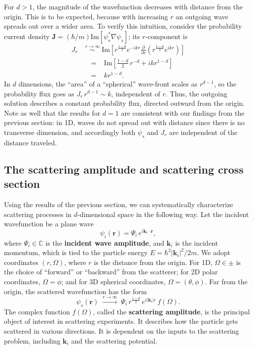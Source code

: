 \documentclass[pra,11pt]{revtex4}
\begin{document}
For $d > 1$, the magnitude of the wavefunction decreases with distance
from the origin.  This is to be expected, because with increasing $r$
an outgoing wave spreads out over a wider area.  To verify this
intuition, consider the probability current density
$\mathbf{J} = (\hbar/m) \mathrm{Im}\left[\psi_s^*\nabla\psi_s\right]$;
its $r$-component is
$$\begin{aligned}J_r \; &\overset{r\rightarrow\infty}{\sim} \; \mathrm{Im}\left[r^{\frac{1-d}{2}} e^{-ikr} \frac{\partial}{\partial r}\left(r^{\frac{1-d}{2}} e^{ikr}\right)\right] \\ &\;\;=\;\;\;\mathrm{Im}\left[\frac{1-d}{2}\, r^{-d} + ik r^{1-d}\right]\\ &\;\;=\;\;\; kr^{1-d}.\end{aligned}$$
In $d$ dimensions, the ``area'' of a ``spherical'' wave-front scales
as $r^{d-1}$, so the probability flux goes as $J_r \,r^{d-1} \sim k$,
independent of $r$.  Thus, the outgoing solution describes a constant
probability flux, directed outward from the origin.  Note as well that
the results for $d=1$ are consistent with our findings from the
previous section: in 1D, waves do not spread out with distance since
there is no transverse dimension, and accordingly both $\psi_s$ and
$J_r$ are independent of the distance traveled.

\subsection{The scattering amplitude and scattering cross section}

Using the results of the previous section, we can systematically
characterize scattering processes in $d$-dimensional space in the
following way.  Let the incident wavefunction be a plane wave
$$\psi_i(\mathbf{r}) = \Psi_i \, e^{i\mathbf{k}_i\cdot\mathbf{r}},$$
where $\Psi_i \in \mathbb{C}$ is the \textbf{incident wave amplitude},
and $\mathbf{k}_i$ is the incident momentum, which is tied to the
particle energy $E = \hbar^2|\mathbf{k}_i|^2/2m$.  We adopt
coordinates $(r,\Omega)$, where $r$ is the distance from the origin.
For 1D, $\Omega \in \pm$ is the choice of ``forward'' or ``backward''
from the scatterer; for 2D polar coordinates, $\Omega = \phi$; and for
3D spherical coordinates, $\Omega = (\theta,\phi)$.  Far from the
origin, the scattered wavefunction has the form
$$\psi_s(\mathbf{r})\;  \overset{r\rightarrow\infty}{\longrightarrow}\; \Psi_i \, r^{\frac{1-d}{2}} \, e^{i|\mathbf{k}_i|r} \, f(\Omega).$$
The complex function $f(\Omega)$, called the \textbf{scattering
  amplitude}, is the principal object of interest in scattering
experiments.  It describes how the particle gets scattered in various
directions.  It is dependent on the inputs to the scattering problem,
including $\mathbf{k}_i$ and the scattering potential.
\end{document}
